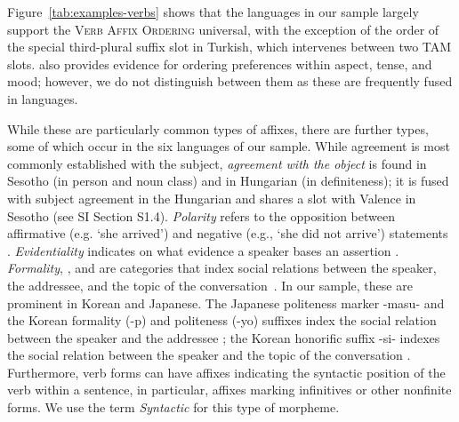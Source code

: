 \documentclass[11pt,letterpaper]{article}
\newcommand{\citep}{\parencite}
\newcommand{\citet}{\Textcite}
\newcounter{def}
\begin{document}

Figure~\ref{tab:examples-verbs} shows that the languages in our sample largely support the \textsc{Verb Affix Ordering} universal, with the exception of the order of the special third-plural suffix slot in Turkish, which intervenes between two TAM slots.
\citet{bybee-morphology-1985} also provides evidence for ordering preferences within aspect, tense, and mood; however, we do not distinguish between them as these are frequently fused in languages.


While these are particularly common types of affixes, there are further types, some of which occur in the six languages of our sample.
While agreement is most commonly established with the subject, \textit{agreement with the object} is found in Sesotho \citep{doke1967textbook} (in person and noun class) and in Hungarian \citep{rounds2001hungarian} (in definiteness); it is fused with subject agreement in the Hungarian and shares a slot with Valence in Sesotho (see SI Section S1.4).
\textit{Polarity} refers to the opposition between affirmative (e.g. `she arrived') and negative  (e.g., `she did not arrive') statements \citep{wals-112}.
\textit{Evidentiality} indicates on what evidence a speaker bases an assertion \citep{aikhenvald2003evidentiality}.
\textit{Formality}, , and  are categories that index social relations between the speaker, the addressee, and the topic of the conversation~\citep{hasegawa2014japanese, yeon2010korean}.
In our sample, these are prominent in Korean and Japanese.
The Japanese politeness marker -masu- and the Korean formality (-p) and politeness (-yo) suffixes index the social relation between the speaker and the addressee \citep{hasegawa2014japanese, yeon2010korean}; the Korean honorific suffix -si- indexes the social relation between the speaker and the topic of the conversation \citep{yeon2010korean}.
Furthermore, verb forms can have affixes indicating the syntactic position of the verb within a sentence, in particular, affixes marking infinitives or other nonfinite forms.
We use the term \textit{Syntactic} for this type of morpheme.
\end{document}
